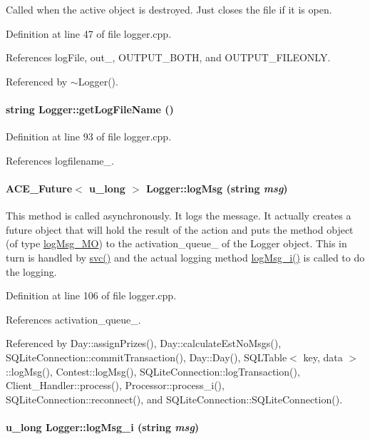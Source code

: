 Called when the active object is destroyed. Just closes the file if it is open. 

Definition at line 47 of file logger.cpp.

References log\-File, out\_\-, OUTPUT\_\-BOTH, and OUTPUT\_\-FILEONLY.

Referenced by $\sim$Logger().\hypertarget{classLogger_Loggera6}{
\paragraph[getLogFileName]{\setlength{\rightskip}{0pt plus 5cm}string Logger::get\-Log\-File\-Name ()}\hfill}
\label{classLogger_Loggera6}




Definition at line 93 of file logger.cpp.

References logfilename\_\-.\hypertarget{classLogger_Loggera7}{
\paragraph[logMsg]{\setlength{\rightskip}{0pt plus 5cm}ACE\_\-Future$<$ u\_\-long $>$ Logger::log\-Msg (string {\em msg})}\hfill}
\label{classLogger_Loggera7}


This method is called asynchronously. It logs the message. It actually creates a future object that will hold the result of the action and puts the method object (of type \hyperlink{classlogMsg__MO}{log\-Msg\_\-MO}) to the activation\_\-queue\_\- of the Logger object. This in turn is handled by \hyperlink{classLogger_Loggera4}{svc()} and the actual logging method \hyperlink{classLogger_Loggera8}{log\-Msg\_\-i()} is called to do the logging. 

Definition at line 106 of file logger.cpp.

References activation\_\-queue\_\-.

Referenced by Day::assign\-Prizes(), Day::calculate\-Est\-No\-Msgs(), SQLite\-Connection::commit\-Transaction(), Day::Day(), SQLTable$<$ key, data $>$::log\-Msg(), Contest::log\-Msg(), SQLite\-Connection::log\-Transaction(), Client\_\-Handler::process(), Processor::process\_\-i(), SQLite\-Connection::reconnect(), and SQLite\-Connection::SQLite\-Connection().\hypertarget{classLogger_Loggera8}{
\paragraph[logMsg\_\-i]{\setlength{\rightskip}{0pt plus 5cm}u\_\-long Logger::log\-Msg\_\-i (string {\em msg})}\hfill}
\label{classLogger_Loggera8}


